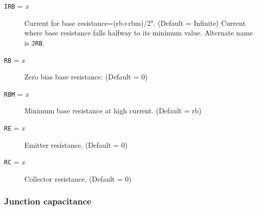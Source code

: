 \begin{description}

\item[{\tt IRB} = {\it x}]
Current for base resistance=(rb+rbm)/2".  (Default = Infinite) Current
where base resistance falls halfway to its minimum value. Alternate
name is {\tt JRB}.

\item[{\tt RB} = {\it x}]
Zero bias base resistance.  (Default = 0)

\item[{\tt RBM} = {\it x}]
Minimum base resistance at high current.  (Default = rb)

\item[{\tt RE} = {\it x}]
Emitter resistance.  (Default = 0)

\item[{\tt RC} = {\it x}]
Collector resistance.  (Default = 0)

\end{description}

\subsubsection{Junction capacitance}

